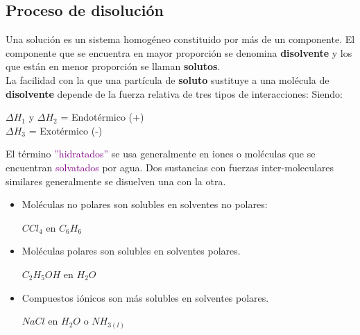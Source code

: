     \subsection{Proceso de disolución}  
        \sangria{} Una solución es un sistema homogéneo constituido por más de un componente. El componente que se encuentra en mayor proporción se denomina \textbf{disolvente} y los que están en menor proporción se llaman \textbf{solutos}. \\
        \sangria{} La facilidad con la que una partícula de \textbf{soluto} sustituye a una molécula de \textbf{disolvente} depende de la fuerza relativa de tres tipos de interacciones:
        Siendo:
        \begin{center}
            $\Delta H_1$ y $\Delta H_2$ = Endotérmico (+) \\
            $\Delta H_3$ = Exotérmico (-)
        \end{center}
        \sangria{} El término \textcolor{purple}{''hidratados''} se usa generalmente en iones o moléculas que se encuentran \textcolor{purple}{solvatados} por agua.
         \vspace{-15pt}
        \sangria{} Dos sustancias con fuerzas inter-moleculares similares generalmente se disuelven una con la otra.
        \begin{itemize}
            \item Moléculas no polares son solubles en solventes no polares:
                \begin{center} $CCl_4$ en $C_6H_6$ \end{center}
            \item Moléculas polares son solubles en solventes polares.
                \begin{center} $C_2H_5OH$ en $H_2O$ \end{center}
            \item Compuestos iónicos son más solubles en solventes polares.
                \begin{center} $NaCl$ en $H_2O$ o $NH_{3(l)}$ \end{center}
        \end{itemize}
        \saltoPag{}
